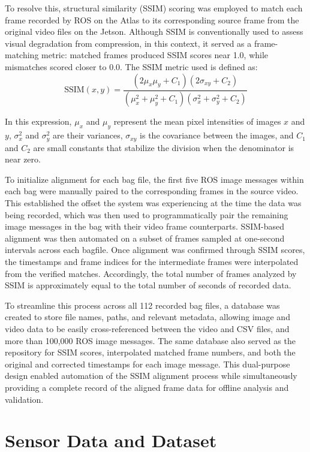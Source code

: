 \documentclass{erauthesis}
\begin{document}
To resolve this, structural similarity (SSIM) scoring was employed to match each frame recorded by ROS on the Atlas to its corresponding source frame from the original video files on the Jetson. 
Although SSIM is conventionally used to assess visual degradation from compression, in this context, it served as a frame-matching metric: matched frames produced SSIM scores near 1.0, while mismatches scored closer to 0.0. The SSIM metric used is defined as:
\begin{equation}
    \text{SSIM}(x, y) = \frac{(2\mu_x\mu_y + C_1)(2\sigma_{xy} + C_2)}{(\mu_x^2 + \mu_y^2 + C_1)(\sigma_x^2 + \sigma_y^2 + C_2)}
\end{equation}

In this expression, $\mu_x$ and $\mu_y$ represent the mean pixel intensities of images $x$ and $y$, $\sigma_x^2$ and $\sigma_y^2$ are their variances, $\sigma_{xy}$ is the covariance between the images, and $C_1$ and $C_2$ are small constants that stabilize the division when the denominator is near zero.

To initialize alignment for each bag file, the first five ROS image messages within each bag were manually paired to the corresponding frames in the source video.
This established the offset the system was experiencing at the time the data was being recorded, which was then used to programmatically pair the remaining image messages in the bag with their video frame counterparts.
SSIM-based alignment was then automated on a subset of frames sampled at one-second intervals across each bagfile. 
Once alignment was confirmed through SSIM scores, the timestamps and frame indices for the intermediate frames were interpolated from the verified matches. 
Accordingly, the total number of frames analyzed by SSIM is approximately equal to the total number of seconds of recorded data.

To streamline this process across all 112 recorded bag files, a database was created to store file names, paths, and relevant metadata, allowing image and video data to be easily cross-referenced between the video and CSV files, and more than 100,000 ROS image messages. 
The same database also served as the repository for SSIM scores, interpolated matched frame numbers, and both the original and corrected timestamps for each image message. 
This dual-purpose design enabled automation of the SSIM alignment process while simultaneously providing a complete record of the aligned frame data for offline analysis and validation.

\section{Sensor Data and Dataset} \label{sec:sensor_data_dataset}
% 
\end{document}
